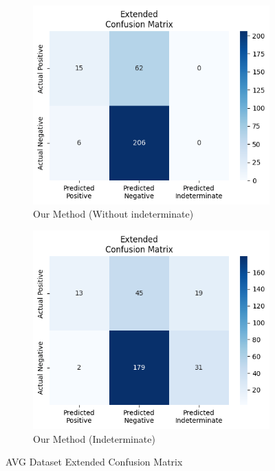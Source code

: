 \begin{figure}[H]
    \begin{subfigure}[b]{0.5\textwidth}
        \centering
        \includegraphics[width=\linewidth]{figures/without_AVG.png}
        \caption{Our Method (Without indeterminate)}
        \label{fig:pta-symptom-method1}
    \end{subfigure}%
    \hfill
    \begin{subfigure}[b]{0.5\textwidth}
        \centering
        \includegraphics[width=\linewidth]{figures/with_AVG.png}
        \caption{Our Method (Indeterminate)}
        \label{fig:pta-symptom-method2}
    \end{subfigure}

    \caption{AVG Dataset Extended Confusion Matrix}
    \label{fig:combined}
\end{figure}

